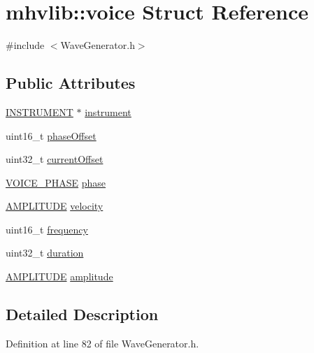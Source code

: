 \hypertarget{structmhvlib_1_1voice}{\section{mhvlib\-:\-:voice Struct Reference}
\label{structmhvlib_1_1voice}
}


{\ttfamily \#include $<$Wave\-Generator.\-h$>$}

\subsection*{Public Attributes}
\begin{DoxyCompactItemize}
\item 
\hyperlink{namespacemhvlib_abe46c8922ff2f901a0a36e388bb411bc}{I\-N\-S\-T\-R\-U\-M\-E\-N\-T} $\ast$ \hyperlink{structmhvlib_1_1voice_a702216bc037445fb09efa34941ab7954}{instrument}
\item 
uint16\-\_\-t \hyperlink{structmhvlib_1_1voice_ab4a07d07daa117761b94659f95e0a846}{phase\-Offset}
\item 
uint32\-\_\-t \hyperlink{structmhvlib_1_1voice_ad9e5ffd23c457eb27268688cbf9c0143}{current\-Offset}
\item 
\hyperlink{namespacemhvlib_aa0be04640f7d224bfc226bca5561dd80}{V\-O\-I\-C\-E\-\_\-\-P\-H\-A\-S\-E} \hyperlink{structmhvlib_1_1voice_ab4625a7fc487c0714ce1d1ac54c750c8}{phase}
\item 
\hyperlink{namespacemhvlib_a15ca117fe572109e56c947a4c6612e7e}{A\-M\-P\-L\-I\-T\-U\-D\-E} \hyperlink{structmhvlib_1_1voice_a0d7297d68b1a2f76d7b1e7cc010cd4a9}{velocity}
\item 
uint16\-\_\-t \hyperlink{structmhvlib_1_1voice_a6d2c0939584f4e989e4377d5d997546e}{frequency}
\item 
uint32\-\_\-t \hyperlink{structmhvlib_1_1voice_a4ad3a0fa2ea88c3cddfde0e47cb60388}{duration}
\item 
\hyperlink{namespacemhvlib_a15ca117fe572109e56c947a4c6612e7e}{A\-M\-P\-L\-I\-T\-U\-D\-E} \hyperlink{structmhvlib_1_1voice_a27ab78996a4d5e289ae149bb81b9bb8c}{amplitude}
\end{DoxyCompactItemize}


\subsection{Detailed Description}


Definition at line 82 of file Wave\-Generator.\-h.



